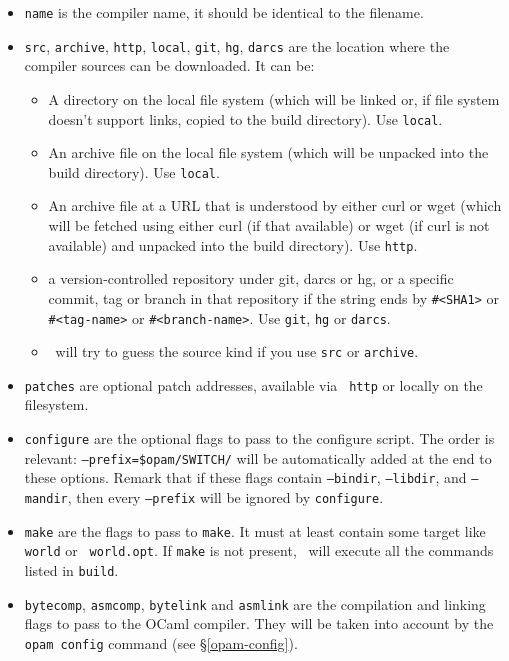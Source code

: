 \documentclass[a4paper,10pt]{article}
\begin{document}
\begin{itemize}

\item {\tt name} is the compiler name, it should be identical to the filename.
\item {\tt src}, {\tt archive}, {\tt http}, {\tt local}, {\tt git},
  {\tt hg}, {\tt darcs} are the location where the compiler sources
  can be downloaded. It can be:

\begin{itemize}
\item A directory on the local file system (which will be linked or,
  if file system doesn't support links, copied to the build
  directory). Use {\tt local}.
\item An archive file on the local file system (which will be unpacked
  into the build directory). Use {\tt local}.
\item An archive file at a URL that is understood by either curl or
  wget (which will be fetched using either curl (if that available) or
  wget (if curl is not available) and unpacked into the build
  directory). Use {\tt http}.
\item a version-controlled repository under git, darcs or
  hg, or a specific commit, tag or branch in that repository if
  the string ends by \verb+#<SHA1>+ or \verb+#<tag-name>+ or
  \verb+#<branch-name>+. Use {\tt git}, {\tt hg} or {\tt darcs}.
\item \OPAM\ will try to guess the source kind if you use {\tt src} or
  {\tt archive}.
\end{itemize}

\item {\tt patches} are optional patch addresses, available via {\tt
  http} or locally on the filesystem.

\item {\tt configure} are the optional flags to pass to the configure
  script. The order is relevant: {\tt --prefix=\$opam/SWITCH/} will be automatically
  added at the end to these options.
  Remark that if these flags contain {\tt --bindir}, {\tt --libdir},
  and {\tt --mandir}, then every {\tt --prefix} will be ignored by {\tt configure}.

\item {\tt make} are the flags to pass to {\tt make}.
  It must at least contain some target like {\tt world} or {\tt
    world.opt}. If {\tt make} is not present, \OPAM\ will execute all
  the commands listed in {\tt build}.

\item {\tt bytecomp}, {\tt asmcomp}, {\tt bytelink} and {\tt asmlink}
  are the compilation and linking flags to pass to the OCaml
  compiler. They will be taken into account by the \verb+opam config+
  command (see \S\ref{opam-config}).


\end{itemize}
\end{document}

